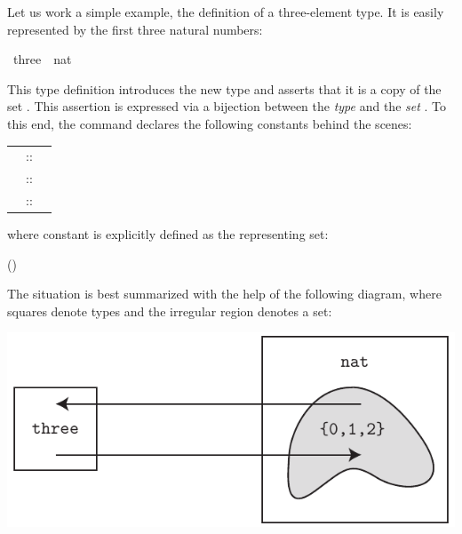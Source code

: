 \begin{isabellebody}
\begin{isamarkuptext}
Let us work a simple example, the definition of a three-element type.
It is easily represented by the first three natural numbers:%
\end{isamarkuptext}%
\isamarkuptrue%
\ three\ {\isacharequal}\ {\isachardoublequote}{\isacharbraceleft}{}{\isacharcolon}{\isacharcolon}nat{\isacharcomma}\ {}{\isacharcomma}\ {}{\isacharbraceright}{\isachardoublequote}\isamarkupfalse%
\isamarkuptrue%
\isamarkupfalse%
\isamarkupfalse%
%
\begin{isamarkuptext}%
This type definition introduces the new type  and asserts
that it is a copy of the set . This assertion
is expressed via a bijection between the \emph{type}  and the
\emph{set} . To this end, the command declares the following
constants behind the scenes:
\begin{center}
\begin{tabular}{rcl}
\isa{three} &::& \isa{nat\ set} \\
\isa{Rep{\isacharunderscore}three} &::& \isa{three\ {\isasymRightarrow}\ nat}\\
\isa{Abs{\isacharunderscore}three} &::& \isa{nat\ {\isasymRightarrow}\ three}
\end{tabular}
\end{center}
where constant  is explicitly defined as the representing set:
\begin{center}
\hfill()
\end{center}
The situation is best summarized with the help of the following diagram,
where squares denote types and the irregular region denotes a set:
\begin{center}
\includegraphics[scale=.8]{typedef}

\end{center}
\end{isamarkuptext}
\end{isabellebody}
